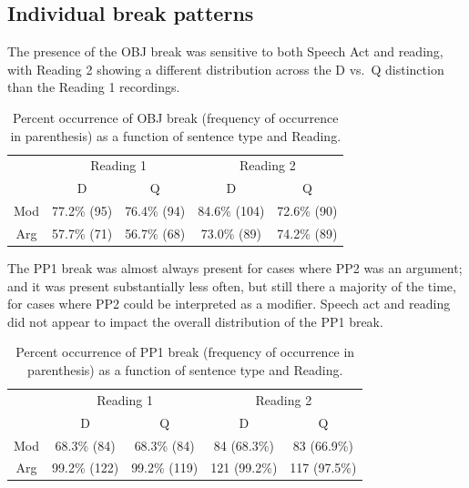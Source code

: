 \documentclass[12pt,oneside]{book}
\begin{document}
\hypertarget{individual-break-patterns}{%
\subsection{Individual break patterns}\label{individual-break-patterns}}


The presence of the OBJ break was sensitive to both Speech Act and reading, with Reading 2 showing a different distribution across the D vs.~Q distinction than the Reading 1 recordings.

\begin{table}[!h]

\caption{\label{tab:obj}Percent occurrence of OBJ break (frequency of occurrence in parenthesis) as a function of sentence type and Reading.}
\centering
\begin{tabular}{ccccc}
\toprule
\multicolumn{1}{c}{ } & \multicolumn{2}{c}{Reading 1} & \multicolumn{2}{c}{Reading 2} \\
\cmidrule(l{3pt}r{3pt}){2-3} \cmidrule(l{3pt}r{3pt}){4-5}
 & D & Q & D & Q\\
\midrule
Mod & 77.2\% (95) & 76.4\% (94) & 84.6\% (104) & 72.6\% (90)\\
Arg & 57.7\% (71) & 56.7\% (68) & 73.0\% (89) & 74.2\% (89)\\
\bottomrule
\end{tabular}
\end{table}


The PP1 break was almost always present for cases where PP2 was an argument; and it was present substantially less often, but still there a majority of the time, for cases where PP2 could be interpreted as a modifier. Speech act and reading did not appear to impact the overall distribution of the PP1 break.

\begin{table}[!h]

\caption{\label{tab:pp1}Percent occurrence of PP1 break (frequency of occurrence in parenthesis) as a function of sentence type and Reading.}
\centering
\begin{tabular}{ccccc}
\toprule
\multicolumn{1}{c}{ } & \multicolumn{2}{c}{Reading 1} & \multicolumn{2}{c}{Reading 2} \\
\cmidrule(l{3pt}r{3pt}){2-3} \cmidrule(l{3pt}r{3pt}){4-5}
 & D & Q & D & Q\\
\midrule
Mod & 68.3\% (84) & 68.3\% (84) & 84 (68.3\%) & 83 (66.9\%)\\
Arg & 99.2\% (122) & 99.2\% (119) & 121 (99.2\%) & 117 (97.5\%)\\
\bottomrule
\end{tabular}
\end{table}
\end{document}
